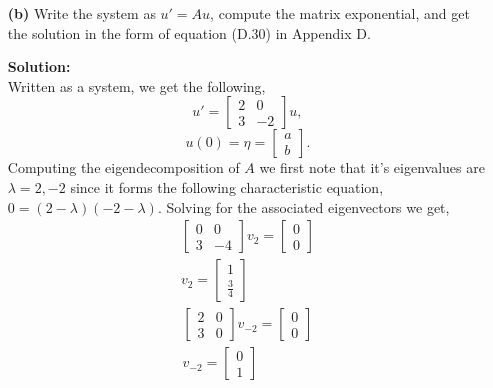 \documentclass[12pt]{article}
\makeatletter
\theoremstyle{homework}
\newenvironment{exercise}[1]
{\def\@currentlabel{#1}\exercisecore}
{\endexercisecore}
\newcommand{\localhead}[1]{\par\smallskip\noindent\textbf{#1}\nobreak\\}%
\newcommand\solution{\localhead{Solution:}}
\makeatother
\begin{document}
\begin{exercise}{Problem P25}
\begin{enumerate}
    \item[\textbf{(b)}] Write the system as $u' = Au$, compute the matrix exponential, and 
    get the solution in the form of equation (D.30) in Appendix D. 
    \solution Written as a system, we get the following, 
    \begin{equation*}
      u' = \begin{bmatrix}
        2 & 0\\
        3 & -2
      \end{bmatrix}
      u,
    \end{equation*}
    \begin{equation*}
      u(0) = \eta = \begin{bmatrix}
        a\\
        b
      \end{bmatrix}.
    \end{equation*}
    Computing the eigendecomposition of $A$ we first note that it's eigenvalues are $\lambda = 2, -2$ since it forms the following
    characteristic equation, $0 = (2 - \lambda)(-2 - \lambda)$. 
    Solving for the associated eigenvectors we get, 
    \begin{align*}
      \begin{bmatrix}
        0 & 0\\
        3 & -4
      \end{bmatrix}
      v_2 = \begin{bmatrix}
        0\\
        0
      \end{bmatrix}\\
      v_2 = \begin{bmatrix}
        1\\
        \frac{3}{4}
      \end{bmatrix}
    \end{align*}
    \begin{align*}
      \begin{bmatrix}
        2 & 0\\
        3 & 0
      \end{bmatrix}
      v_{-2} = \begin{bmatrix}
        0\\
        0
      \end{bmatrix}\\
      v_{-2} = \begin{bmatrix}
        0\\
        1
      \end{bmatrix}
    \end{align*}

\end{enumerate}
\end{exercise}
\end{document}
